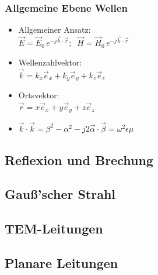 \begin{multicols}{3}
{	 \subsubsection{Allgemeine Ebene Wellen}
	 \begin{itemize}
	 	\itemsep0pt
		\item Allgemeiner Ansatz:\\
		\(\vec{E} = \vec{E}_0\,e^{-j\vec{k}\cdot\vec{r}};\;\;\vec{H} = \vec{H}_0\,e^{-j\vec{k}\cdot\vec{r}}\)
		\item Wellenzahlvektor:\\
		\(\vec{k} = k_x\vec{e}_x + k_y\vec{e}_y + k_z\vec{e}_z\)
		\item Ortsvektor:\\
		\(\vec{r} = x\vec{e}_x + y\vec{e}_y + z\vec{e}_z\)
		\item \(\vec{k}\cdot\vec{k} = \beta^2 - \alpha^2 - j2\vec{\alpha}\cdot\vec{\beta} = \omega^2\epsilon\mu\)
	 \end{itemize}
	 }

	 \subsection{Reflexion und Brechung}
	 \subsection{Gauß'scher Strahl}
	 \subsection{TEM-Leitungen}
	 \subsection{Planare Leitungen}
	\end{multicols}
